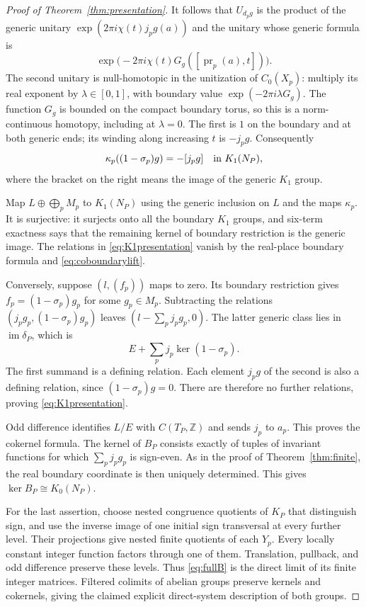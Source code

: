 \documentclass[11pt]{article}
\newcommand{\Z}{\mathbb Z}
\theoremstyle{definition}
\theoremstyle{remark}
\begin{document}
\begin{proof}[Proof of Theorem~\ref{thm:presentation}]
It follows that $U_{d_pg}$ is the product of the generic unitary
$\exp(2\pi i\chi(t)j_pg(a))$ and the unitary whose generic formula is
\[
 \exp\bigl(-2\pi i\chi(t)G_g([\operatorname{pr}_p(a),t])\bigr).
\]
The second unitary is null-homotopic in the unitization of $C_0(X_p)$: multiply its real exponent by $\lambda\in[0,1]$, with boundary value $\exp(-2\pi i\lambda G_g)$. The function $G_g$ is bounded on the compact boundary torus, so this is a norm-continuous homotopy, including at $\lambda=0$. The first is $1$ on the boundary and at both generic ends; its winding along increasing $t$ is $-j_pg$. Consequently
\begin{equation}\label{eq:coboundarylift}
 \kappa_p((1-\sigma_p)g)=-[j_pg]\quad\hbox{in }K_1(N_P),
\end{equation}
where the bracket on the right means the image of the generic $K_1$ group.

Map $L\oplus\bigoplus_pM_p$ to $K_1(N_P)$ using the generic inclusion on $L$ and the maps $\kappa_p$. It is surjective: it surjects onto all the boundary $K_1$ groups, and six-term exactness says that the remaining kernel of boundary restriction is the generic image. The relations in \eqref{eq:K1presentation} vanish by the real-place boundary formula and \eqref{eq:coboundarylift}.

Conversely, suppose $(l,(f_p))$ maps to zero. Its boundary restriction gives $f_p=(1-\sigma_p)g_p$ for some $g_p\in M_p$. Subtracting the relations $(j_pg_p,(1-\sigma_p)g_p)$ leaves $(l-\sum_pj_pg_p,0)$. The latter generic class lies in $\operatorname{im}\delta_P$, which is
\[
 E+\sum_pj_p\ker(1-\sigma_p).
\]
The first summand is a defining relation. Each element $j_pg$ of the second is also a defining relation, since $(1-\sigma_p)g=0$. There are therefore no further relations, proving \eqref{eq:K1presentation}.

Odd difference identifies $L/E$ with $C(T_P,\Z)$ and sends $j_p$ to $a_p$. This proves the cokernel formula. The kernel of $B_P$ consists exactly of tuples of invariant functions for which $\sum_pj_pg_p$ is sign-even. As in the proof of Theorem~\ref{thm:finite}, the real boundary coordinate is then uniquely determined. This gives $\ker B_P\cong K_0(N_P)$.

For the last assertion, choose nested congruence quotients of $K_P$ that distinguish sign, and use the inverse image of one initial sign transversal at every further level. Their projections give nested finite quotients of each $Y_p$. Every locally constant integer function factors through one of them. Translation, pullback, and odd difference preserve these levels. Thus \eqref{eq:fullB} is the direct limit of its finite integer matrices. Filtered colimits of abelian groups preserve kernels and cokernels, giving the claimed explicit direct-system description of both groups.
\end{proof}
\end{document}

